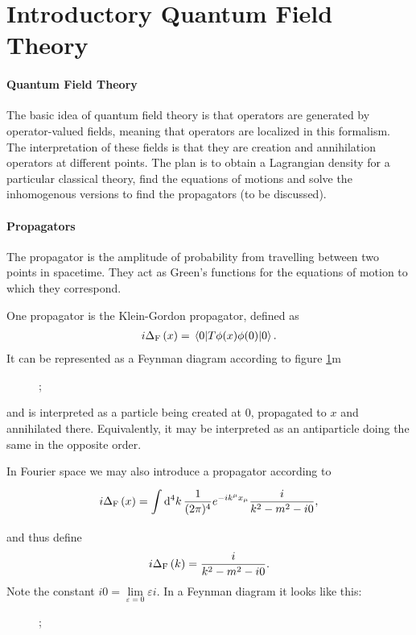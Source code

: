 \section{Introductory Quantum Field Theory}

\paragraph{Quantum Field Theory}
The basic idea of quantum field theory is that operators are generated by operator-valued fields, meaning that operators are localized in this formalism. The interpretation of these fields is that they are creation and annihilation operators at different points. The plan is to obtain a Lagrangian density for a particular classical theory, find the equations of motions and solve the inhomogenous versions to find the propagators (to be discussed).

\paragraph{Propagators}
The propagator is the amplitude of probability from travelling between two points in spacetime. They act as Green's functions for the equations of motion to which they correspond.

One propagator is the Klein-Gordon propagator, defined as
\begin{align*}
	i\Delta_{\text{F}}\left(x\right) = \expval{\ensuremath{T}{\phi(x)}{\phi(0)}}{0}.
\end{align*}
It can be represented as a Feynman diagram according to figure \ref{fig:kgprop}m
\begin{figure}[!ht]
	\centering
	;
	\label{fig:kgprop}
\end{figure}
and is interpreted as a particle being created at $0$, propagated to $x$ and annihilated there. Equivalently, it may be interpreted as an antiparticle doing the same in the opposite order.

In Fourier space we may also introduce a propagator according to
\begin{align*}
	i\Delta_{\text{F}}\left(x\right) = \int\limits_{}^{}\dd[4]{k}\frac{1}{(2\pi)^{4}}e^{-ik^{\mu}x_{\mu}}\frac{i}{k^{2} - m^{2} - i0},
\end{align*}
and thus define
\begin{align*}
i\Delta_{\text{F}}\left(k\right) = \frac{i}{k^{2} - m^{2} - i0}.
\end{align*}
Note the constant $i0 = \lim\limits_{\varepsilon = 0}\varepsilon i$. In a Feynman diagram it looks like this:
\begin{figure}[!ht]
	\centering
	;
\end{figure}

